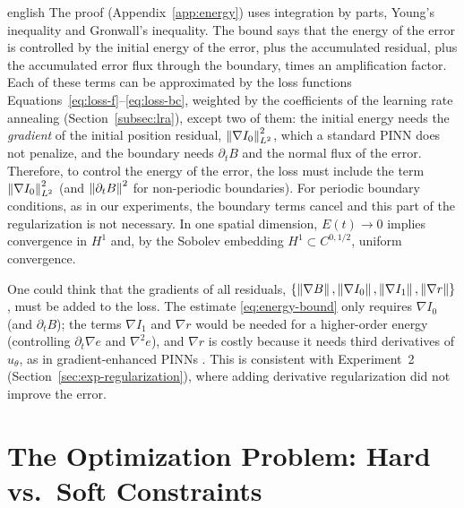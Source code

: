 \documentclass[0000.tex]{subfiles}
\begin{document}
\begin{hyphenrules}{english}
The proof (Appendix~\ref{app:energy}) uses integration by parts, Young's inequality and Gronwall's inequality.
The bound says that the energy of the error is controlled by the initial energy of the error, plus the
accumulated residual, plus the accumulated error flux through the boundary, times an amplification
factor. Each of these terms can be approximated by the loss functions
Equations~\eqref{eq:loss-f}--\eqref{eq:loss-bc}, weighted by the coefficients of the learning rate annealing
(Section~\ref{subsec:lra}), except two of them: the initial energy needs the \emph{gradient} of the initial
position residual, $\left\lVert \nabla I_0 \right\rVert^2_{L^2}$, which a standard PINN does not penalize, and the boundary
needs $\partial_tB$ and the normal flux of the error. Therefore, to control the energy of the error, the
loss must include the term $\left\lVert \nabla I_0 \right\rVert^2_{L^2}$ (and $\left\lVert \partial_tB \right\rVert^2$ for non-periodic
boundaries). For periodic boundary conditions, as in our experiments, the boundary terms cancel and this
part of the regularization is not necessary. In one spatial dimension, $E(t)\to0$ implies convergence
in $H^1$ and, by the Sobolev embedding $H^1\subset C^{0,1/2}$, uniform convergence.

\begin{remarkbox}
One could think that the gradients of all residuals,
$\{\left\lVert \nabla B \right\rVert,\left\lVert \nabla I_0 \right\rVert,\left\lVert \nabla I_1 \right\rVert,\left\lVert \nabla r \right\rVert\}$, must be added to the loss.
The estimate \eqref{eq:energy-bound} only requires $\nabla I_0$ (and $\partial_tB$); the terms
$\nabla I_1$ and $\nabla r$ would be needed for a higher-order energy (controlling $\partial_t\nabla e$
and $\nabla^2e$), and $\nabla r$ is costly because it needs third derivatives of $u_\theta$, as in
gradient-enhanced PINNs \cite{yu2022gpinn}. This is consistent with Experiment~2
(Section~\ref{sec:exp-regularization}), where adding derivative regularization did not improve the error.
\end{remarkbox}

\section{The Optimization Problem: Hard vs.\ Soft Constraints}\label{sec:optimization}


\end{hyphenrules}
\end{document}
